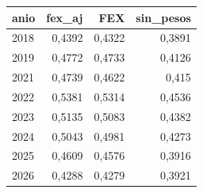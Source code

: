 \begin{tabular}{lrrr}
\toprule
anio & fex\_aj & FEX & sin\_pesos \\
\midrule
2018 & 0,4392 & 0,4322 & 0,3891 \\
2019 & 0,4772 & 0,4733 & 0,4126 \\
2021 & 0,4739 & 0,4622 & 0,415 \\
2022 & 0,5381 & 0,5314 & 0,4536 \\
2023 & 0,5135 & 0,5083 & 0,4382 \\
2024 & 0,5043 & 0,4981 & 0,4273 \\
2025 & 0,4609 & 0,4576 & 0,3916 \\
2026 & 0,4288 & 0,4279 & 0,3921 \\
\bottomrule
\end{tabular}
